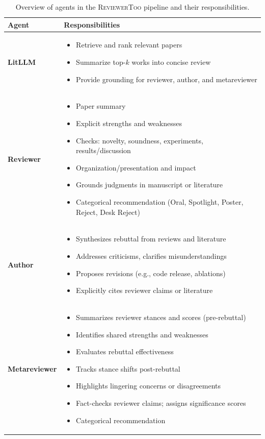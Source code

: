 \documentclass{article} %
\begin{document}
\begin{table}[t]
\centering
\small
\renewcommand{\arraystretch}{1.1}
\begin{tabularx}{\linewidth}{l L}
\toprule
\textbf{Agent} & \textbf{Responsibilities} \\
\midrule
\textbf{LitLLM} &
\begin{itemize}
    \item Retrieve and rank relevant papers
    \item Summarize top-$k$ works into concise review
    \item Provide grounding for reviewer, author, and metareviewer
\end{itemize} \\
\textbf{Reviewer} &
\begin{itemize}
    \item Paper summary
    \item Explicit strengths and weaknesses
    \item Checks: novelty, soundness, experiments, results/discussion
    \item Organization/presentation and impact
    \item Grounds judgments in manuscript or literature
    \item Categorical recommendation (Oral, Spotlight, Poster, Reject, Desk Reject)
\end{itemize} \\
\textbf{Author} &
\begin{itemize}
    \item Synthesizes rebuttal from reviews and literature
    \item Addresses criticisms, clarifies misunderstandings
    \item Proposes revisions (e.g., code release, ablations)
    \item Explicitly cites reviewer claims or literature
\end{itemize} \\
\textbf{Metareviewer} &
\begin{itemize}
    \item Summarizes reviewer stances and scores (pre-rebuttal)
    \item Identifies shared strengths and weaknesses
    \item Evaluates rebuttal effectiveness
    \item Tracks stance shifts post-rebuttal
    \item Highlights lingering concerns or disagreements
    \item Fact-checks reviewer claims; assigns significance scores
    \item Categorical recommendation
\end{itemize} \\
\bottomrule
\end{tabularx}
\caption{Overview of agents in the \textsc{ReviewerToo} pipeline and their responsibilities.}
\label{tab:agents}
\end{table}
\end{document}
